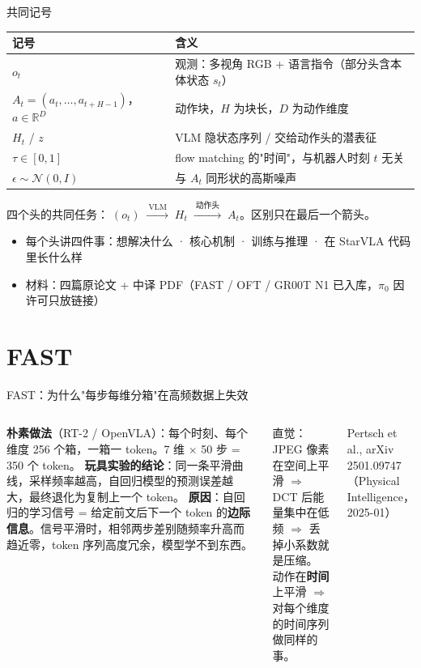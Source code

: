 \documentclass[aspectratio=169,10pt]{beamer}
\newcommand{\con}[1]{\textcolor{negative}{#1}}
\begin{document}
\begin{frame}{共同记号}
  \begin{center}\small
  \begin{tabular}{p{4.2cm}p{8.8cm}}
    \toprule
    记号 & 含义 \\
    \midrule
    $o_t$ & 观测：多视角 RGB + 语言指令（部分头含本体状态 $s_t$） \\
    $A_t=(a_t,\dots,a_{t+H-1})$，$a\in\mathbb{R}^D$ & 动作块，$H$ 为块长，$D$ 为动作维度 \\
    $H_t$ / $z$ & VLM 隐状态序列 / 交给动作头的潜表征 \\
    $\tau\in[0,1]$ & flow matching 的"时间"，与机器人时刻 $t$ 无关 \\
    $\epsilon\sim\mathcal N(0,I)$ & 与 $A_t$ 同形状的高斯噪声 \\
    \bottomrule
  \end{tabular}
  \end{center}
  \vspace{6pt}
  四个头的共同任务：$\;(o_t)\;\xrightarrow{\ \text{VLM}\ }\;H_t\;\xrightarrow{\ \text{动作头}\ }\;A_t$。区别只在最后一个箭头。
  \vspace{4pt}
  \begin{itemize}
    \item 每个头讲四件事：想解决什么 · 核心机制 · 训练与推理 · 在 StarVLA 代码里长什么样
    \item 材料：四篇原论文 + 中译 PDF（FAST / OFT / GR00T N1 已入库，$\pi_0$ 因许可只放链接）
  \end{itemize}
\end{frame}

\section{FAST}
\begin{frame}{FAST：为什么"每步每维分箱"在高频数据上失效}
  \begin{columns}[T]
    \textbf{朴素做法}（RT-2 / OpenVLA）：每个时刻、每个维度 256 个箱，一箱一 token。7 维 $\times$ 50 步 = 350 个 token。
    \vspace{4pt}
    \textbf{玩具实验的结论}：同一条平滑曲线，采样频率越高，自回归模型的预测误差越大，最终退化为\con{复制上一个 token}。
    \vspace{4pt}
    \textbf{原因}：自回归的学习信号 = 给定前文后下一个 token 的\textbf{边际信息}。信号平滑时，相邻两步差别随频率升高而趋近零，token 序列高度冗余，模型学不到东西。
    \begin{exampleblock}{直觉：JPEG}
      像素在空间上平滑 $\Rightarrow$ DCT 后能量集中在低频 $\Rightarrow$ 丢掉小系数就是压缩。\\[3pt]
      动作在\textbf{时间}上平滑 $\Rightarrow$ 对每个维度的时间序列做同样的事。
    \end{exampleblock}
    \vspace{4pt}
    \small Pertsch et al., arXiv 2501.09747（Physical Intelligence，2025-01）
  \end{columns}
\end{frame}
\end{document}
